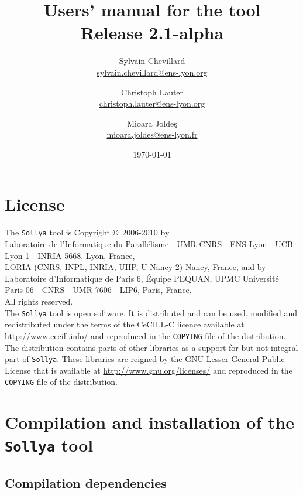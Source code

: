 \documentclass[a4paper]{article}
\title{Users' manual for the \sollya tool \\ {\large Release 2.1-alpha}}
\author{Sylvain Chevillard \\ \small{\url{sylvain.chevillard@ens-lyon.org}} \and Christoph Lauter \\ \small{\url{christoph.lauter@ens-lyon.org}} \and Mioara Jolde\c{s} \\ \small{\url{mioara.joldes@ens-lyon.fr}} }
\date{\today}
\newcommand{\sollya}{\texttt{Sollya}\xspace}
\begin{document}
\maketitle

\section*{License}

The \sollya tool is Copyright \copyright~2006-2010 by \vspace{2mm} \\
\indent Laboratoire de
l'Informatique du Parall\'elisme - UMR CNRS - ENS Lyon - UCB Lyon 1 -
INRIA 5668, Lyon, France, \vspace{2mm} \\
\indent LORIA (CNRS, INPL, INRIA, UHP, U-Nancy 2) Nancy, France, and by \vspace{2mm} \\
\indent Laboratoire d'Informatique de Paris 6, \'Equipe PEQUAN,
UPMC Universit\'e Paris 06 - CNRS - UMR 7606 - LIP6, Paris, France. \vspace{2mm} \\
All rights reserved.\\[0.2cm]

\noindent The \sollya tool is open software. It is distributed and can be used,
modified and redistributed under the terms of the CeCILL-C licence
available at \url{http://www.cecill.info/} and reproduced in the
\texttt{COPYING} file of the distribution. The distribution contains
parts of other libraries as a support for but not integral part of
\sollya. These libraries are reigned by the GNU Lesser General Public
License that is available at \url{http://www.gnu.org/licenses/} and
reproduced in the \texttt{COPYING} file of the distribution.

\tableofcontents

\section{Compilation and installation of the \sollya tool}

\subsection{Compilation dependencies}
\end{document}
